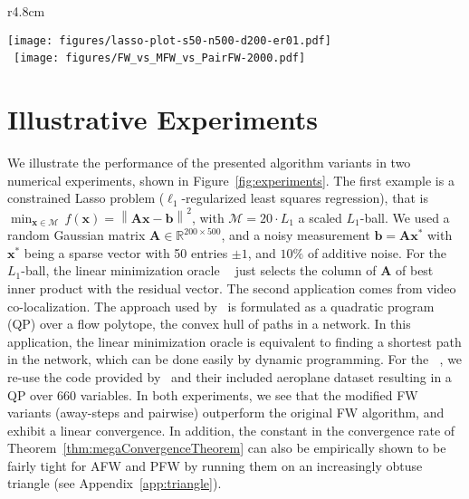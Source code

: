 \documentclass{article} %
\providecommand{\norm}[1]{\left\lVert#1\right\rVert}
\newcommand{\R}{\mathbb{R}}
\newcommand{\domain}{\mathcal{M}} %
\newcommand{\FW}{{\hspace{0.05em}\textnormal{FW}}}
\newcommand{\x}{\bm{x}}
\DeclareMathOperator*{\lmo}{LMO_{\!\Vertices}}
\newcommand{\Vertices}{\mathcal{A}} %
\newcommand{\A}{\bm{A}}
\newcommand{\bv}{\bm{b}}
\newcommand{\0}{\mathbf{0}} %
\begin{document}
\begin{wrapfigure}{r}{4.8cm}\vspace{-1.5em}
%
  \vspace{-8mm}
  \begin{center}
  \texttt{[image: figures/lasso-plot-s50-n500-d200-er01.pdf]}
  \\%
  \ \texttt{[image: figures/FW\_vs\_MFW\_vs\_PairFW-2000.pdf]}
  \vspace{-1em}
  \caption{\small Duality gap $g_t^\FW$ vs iterations on the Lasso problem (top), and video co-localization (bottom). 
  Code is available from the authors' website.
  }
  \label{fig:experiments}
  \end{center}  \vspace{-1em}
%
\end{wrapfigure}

%
\vspace{-4mm}
\section{Illustrative Experiments}
\vspace{-2mm}

We illustrate the performance of the presented algorithm variants in two
numerical experiments, shown in Figure~\ref{fig:experiments}.
%
The first example is a constrained Lasso problem ($\ell_1$-regularized least
squares regression), that is $\min_{\x \in \domain} \, f(\x) =
\norm{\A\x-\bv}^2$, with $\domain=20\cdot L_1$ a scaled $L_1$-ball. We used a
random Gaussian matrix $\A\in \R^{200 \times 500}$, and a noisy measurement
$\bv=\A\x^*$ with $\x^*$ being a sparse vector with 50 entries $\pm1$, and
$10\%$ of additive noise. For the $L_1$-ball, the linear minimization oracle
$\lmo$ just selects the column of $\A$ of best inner product with the residual vector.
%
The second application comes from video co-localization. The approach used
by~\citep{Joulin:2014uw} is formulated as a quadratic program (QP) over a
flow polytope, the convex hull of paths in a network. In this application,
the linear minimization oracle is equivalent to finding a shortest path in
the network, which can be done easily by dynamic
programming. %
For the $\lmo$, we re-use the code provided
by~\citep{Joulin:2014uw} %
and their included \textsf{\small aeroplane} dataset resulting in a QP over
660 variables.
%
In both experiments, we see that the modified FW variants (away-steps and
pairwise) outperform the original FW algorithm, and exhibit a linear convergence.
%
In addition, the constant in the convergence rate of Theorem~\ref{thm:megaConvergenceTheorem}
can also be empirically shown to be fairly tight for AFW and PFW by running them
on an increasingly obtuse triangle (see Appendix~\ref{app:triangle}).
\end{document}
